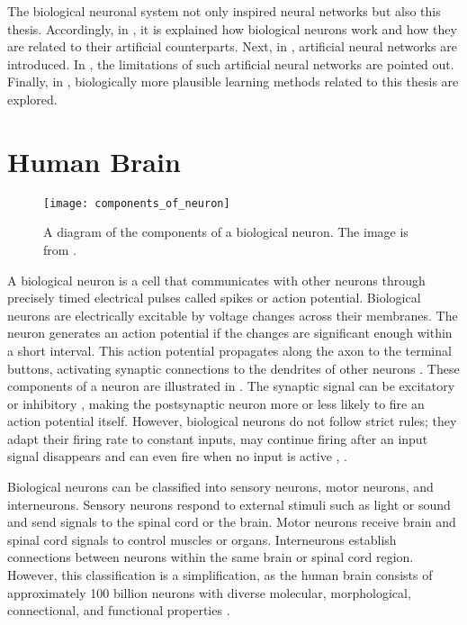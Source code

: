 The biological neuronal system not only inspired neural networks but also this thesis.
Accordingly, in , it is explained how biological neurons work and how they are related to their artificial counterparts.
Next, in , artificial neural networks are introduced.
In , the limitations of such artificial neural networks are pointed out.
Finally, in , biologically more plausible learning methods related to this thesis are explored.

\section{Human Brain}
\begin{figure}[h]
    \centering
    \texttt{[image: components\_of\_neuron]}
    \caption[Diagram of the components of a biological neuron]{A diagram of the components of a biological neuron. The image is from .}
\end{figure}

A biological neuron is a cell that communicates with other neurons through precisely timed electrical pulses called spikes or action potential.
Biological neurons are electrically excitable by voltage changes across their membranes.
The neuron generates an action potential if the changes are significant enough within a short interval.
This action potential propagates along the axon to the terminal buttons, activating synaptic connections to the dendrites of other neurons .
These components of a neuron are illustrated in .
The synaptic signal can be excitatory  or inhibitory , making the postsynaptic neuron more or less likely to fire an action potential itself.
However, biological neurons do not follow strict rules; they adapt their firing rate to constant inputs, may continue firing after an input signal disappears and can even fire when no input is active , \cite{diamond_identifying_2019}.

Biological neurons can be classified into sensory neurons, motor neurons, and interneurons.
Sensory neurons respond to external stimuli such as light or sound and send signals to the spinal cord or the brain.
Motor neurons receive brain and spinal cord signals to control muscles or organs.
Interneurons establish connections between neurons within the same brain or spinal cord region.
However, this classification is a simplification, as the human brain consists of approximately 100 billion neurons  with diverse molecular, morphological, connectional, and functional properties .

